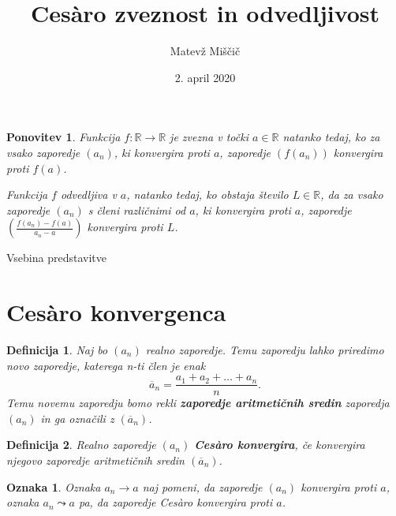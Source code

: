 \documentclass[10]{beamer}
\title{Ces\`{a}ro zveznost in odvedljivost}
\author{Matevž Miščič}
\date{2. april 2020}
\newtheorem{definicija}{Definicija}
\newtheorem{ponovitev}{Ponovitev}
\newtheorem{oznaka}{Oznaka}
\begin{document}
    
\begin{frame}
    \titlepage
\end{frame}

\begin{frame}
    \begin{ponovitev}
        Funkcija $f: \mathbb{R} \rightarrow \mathbb{R}$ je zvezna v točki $a \in \mathbb{R}$ natanko tedaj, ko za vsako zaporedje $(a_n)$, ki konvergira proti $a$, zaporedje $(f(a_n))$ konvergira proti $f(a)$.
        \pause
        
        \medskip
        Funkcija $f$ odvedljiva v $a$, natanko tedaj, ko obstaja število $L \in \mathbb{R}$, da za vsako zaporedje $(a_n)$ s členi različnimi od $a$, ki konvergira proti $a$, zaporedje $(\frac{f(a_n)-f(a)}{a_n-a})$ konvergira proti $L$.
    \end{ponovitev}
\end{frame}

\begin{frame}{Vsebina predstavitve}
    \tableofcontents
\end{frame}



\section{Ces\`{a}ro konvergenca}

\begin{frame}
    \begin{definicija}
        Naj bo $(a_n)$ realno zaporedje. Temu zaporedju lahko priredimo novo zaporedje, katerega n-ti člen je enak 
        $$\overline{a}_n = \frac{a_1+a_2+\ldots+a_n}{n}.$$ 
        Temu novemu zaporedju bomo rekli \textbf{zaporedje aritmetičnih sredin} zaporedja $(a_n)$ in ga označili z $(\overline{a}_n)$.
    \end{definicija}
    \pause
    \begin{definicija}
        Realno zaporedje $(a_n)$ \textbf{Ces\`{a}ro konvergira}, če konvergira njegovo zaporedje aritmetičnih sredin $(\overline{a}_n)$.
    \end{definicija}
    \pause
    \begin{oznaka}
        Oznaka $a_n \rightarrow a$ naj pomeni, da zaporedje $(a_n)$ konvergira proti $a$, oznaka $a_n \leadsto a$ pa, da zaporedje Ces\`{a}ro konvergira proti $a$. 
    \end{oznaka}
\end{frame}
\end{document}

